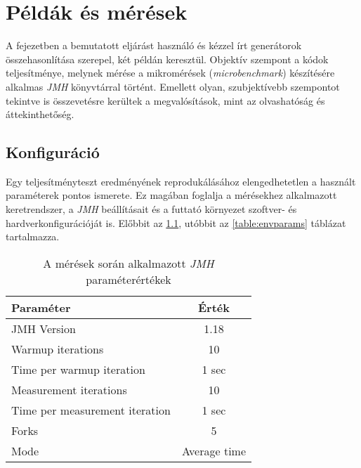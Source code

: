 \chapter{Példák és mérések}\label{ch:peldakEsMeresek}

A fejezetben a bemutatott eljárást használó és kézzel írt generátorok összehasonlítása szerepel, két példán keresztül. Objektív szempont a kódok teljesítménye, melynek mérése a mikromérések (\textit{microbenchmark}) készítésére alkalmas \textit{JMH} könyvtárral történt. Emellett olyan, szubjektívebb szempontot tekintve is összevetésre kerültek a megvalósítások, mint az olvashatóság és áttekinthetőség.

\section{Konfiguráció}

Egy teljesítményteszt eredményének reprodukálásához elengedhetetlen a használt paraméterek pontos ismerete. Ez magában foglalja a mérésekhez alkalmazott keretrendszer, a \textit{JMH} beállításait és a futtató környezet szoftver- és hardverkonfigurációját is. Előbbit az \ref{table:jmhparams}, utóbbit az \ref{table:envparams} táblázat tartalmazza.

\begin{table}[h]
\captionsetup{justification=centering}
\centering
  \begin{tabular}{|| l | c ||}
  \hline
  Paraméter & Érték \\
  \hline \hline
  JMH Version                        & 1.18 \\
  \hline
  Warmup iterations                  & 10 \\
  Time per warmup iteration          & 1 sec \\
  \hline
  Measurement iterations             & 10 \\
  Time per measurement iteration     & 1 sec \\
  \hline
  Forks                              & 5 \\
  \hline                               
  Mode                               & Average time \\
  \hline
  \end{tabular}
\caption{A mérések során alkalmazott \textit{JMH} paraméterértékek}  
\label{table:jmhparams}
\end{table}

